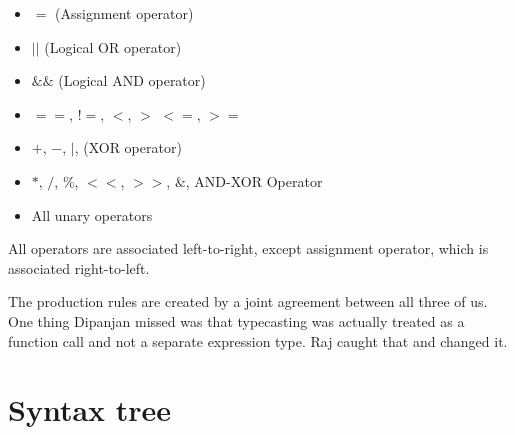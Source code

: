 \documentclass[preprint,12pt]{elsarticle}
\begin{document}
\begin{itemize}
\item $=$ (Assignment operator)
\item $||$ (Logical OR operator)
\item $\&\&$ (Logical AND operator)
\item $==$, $!=$, $<$, $>$ $<=$, $>=$
\item $+$, $-$, $|$, (XOR operator)
\item $*$, $/$, $\%$, $<<$, $>>$, $\&$, AND-XOR Operator
\item All unary operators
\end{itemize}

All operators are associated left-to-right, except assignment operator, which is associated right-to-left.

The production rules are created by a joint agreement between all three of us. One thing Dipanjan missed was that typecasting was actually treated as a function call and not a separate expression type. Raj caught that and changed it. 

\section{Syntax tree}
\end{document}
